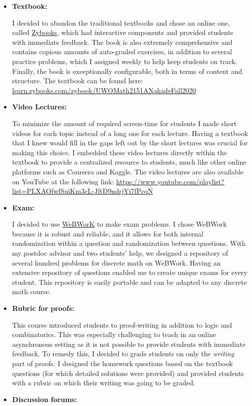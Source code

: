\documentclass[
]{report}
\begin{document}
\begin{itemize}
\item
  \textbf{Textbook:}

  I decided to abandon the traditional textbooks and chose an online one, called \href{https://learn.zybooks.com/zybook/UWOMath2151ANakadeFall2020}{Zybooks}, which had interactive components and provided students with immediate feedback. The book is also extremely comprehensive and contains copious amounts of auto-graded exercises, in addition to several practice problems, which I assigned weekly to help keep students on track. Finally, the book is exceptionally configurable, both in terms of content and structure.
  The textbook can be found here: \href{https://learn.zybooks.com/zybook/UWOMath2151ANakadeFall2020}{learn.zybooks.com/zybook/UWOMath2151ANakadeFall2020}
\item
  \textbf{Video Lectures:}

  To minimize the amount of required screen-time for students I made short videos for each topic instead of a long one for each lecture.
  Having a textbook that I knew would fill in the gaps left out by the short lectures was crucial for making this choice.
  I embedded these video lectures directly within the textbook to provide a centralized resource to students, much like other online platforms such as Coursera and Kaggle.
  The video lectures are also available on YouTube at the following link: \url{https://www.youtube.com/playlist?list=PLXAOfwfSuiKm3cL-JftD9ndrjYi7fPcqN}
\item
  \textbf{Exam:}

  I decided to use \href{https://webwork.maa.org}{WeBWorK} to make exam problems.
  I chose WeBWork because it is robust and reliable, and it allows for both internal randomization within a question and randomization between questions.
  With my postdoc advisor and two students' help, we designed a repository of several hundred problems for discrete math on WeBWork.
  Having an extensive repository of questions enabled me to create unique exams for every student.
  This repository is easily portable and can be adapted to any discrete math course.
\item
  \textbf{Rubric for proofs:}

  This course introduced students to proof-writing in addition to logic and combinatorics.
  This was especially challenging to teach in an online asynchronous setting as it is not possible to provide students with immediate feedback.
  To remedy this, I decided to grade students on only the \emph{writing} part of proofs.
  I designed the homework questions based on the textbook questions (for which detailed solutions were provided) and provided students with a rubric on which their writing was going to be graded.
\item
  \textbf{Discussion forums:}


\end{itemize}
\end{document}
